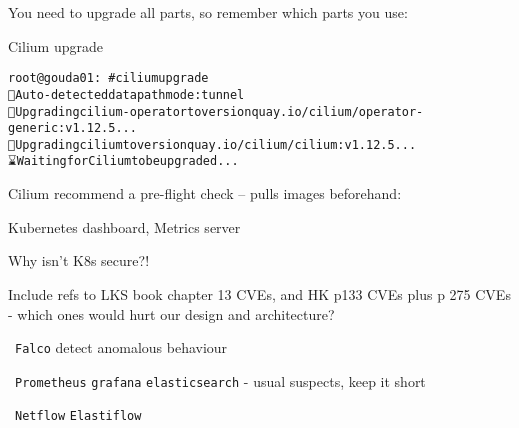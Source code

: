 \documentclass[Screen16to9,17pt]{foils}
\begin{document}

\begin{quote}

\end{quote}

You need to upgrade all parts, so remember which parts you use:
\begin{list2}
\item
\item Cilium upgrade
\end{list2}

\slide{}


\begin{alltt}
root@gouda01:~# cilium upgrade
🔮 Auto-detected datapath mode: tunnel
🚀 Upgrading cilium-operator to version quay.io/cilium/operator-generic:v1.12.5...
🚀 Upgrading cilium to version quay.io/cilium/cilium:v1.12.5...
⌛ Waiting for Cilium to be upgraded...

\end{alltt}

\begin{list2}
    \item
\end{list2}

Cilium recommend a pre-flight check -- pulls images beforehand:\\


\begin{list2}
\item Kubernetes dashboard, Metrics server
\end{list2}


Why isn't K8s secure?!
\begin{list2}
\item Include refs to LKS book chapter 13 CVEs, and HK p133 CVEs plus p 275 CVEs
- which ones would hurt our design and architecture?
\end{list2}


\begin{list2}
\item \faWrench\ \verb+Falco+ detect anomalous behaviour
\item \faWrench\ \verb+Prometheus+ \verb+grafana+ \verb+elasticsearch+ - usual suspects, keep it short
\item \faWrench\ \verb+Netflow+ \verb+Elastiflow+
\end{list2}
\end{document}
